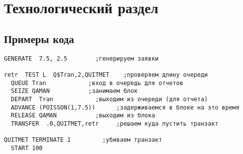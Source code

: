 \chapter{Технологический раздел}

\section{Примеры кода}

\begin{lstlisting}[caption={}]
  GENERATE  7.5, 2.5        ;генерируем заявки

retr  TEST L  Q$Tran,2,QUITMET    ;проверяем длину очереди
  QUEUE Tran            ;вход в очередь для отчетов
  SEIZE QAMAN           ;занимаем блок
  DEPART  Tran            ;выходим из очереди (для отчета)
  ADVANCE (POISSON(1,7.5))      ;задерживаемся в блоке на это время
  RELEASE QAMAN           ;выходим из блока
  TRANSFER  .0,QUITMET,retr     ;решаем куда пустить транзакт

QUITMET TERMINATE 1         ;убиваем транзакт
  START 100
\end{lstlisting}

